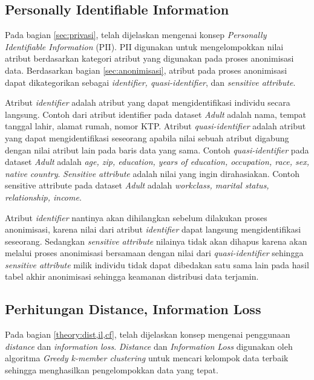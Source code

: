 \subsection{Personally Identifiable Information}
Pada bagian \ref{sec:privasi}, telah dijelaskan mengenai konsep \textit{Personally Identifiable Information} (PII). PII digunakan untuk mengelompokkan nilai atribut berdasarkan kategori atribut yang digunakan pada proses anonimisasi data. Berdasarkan bagian \ref{sec:anonimisasi}, atribut pada proses anonimisasi dapat dikategorikan sebagai \textit{identifier, quasi-identifier}, dan \textit{sensitive attribute}. 
\par Atribut \textit{identifier} adalah atribut yang dapat mengidentifikasi individu secara langsung. Contoh dari atribut identifier pada dataset \textit{Adult} adalah nama, tempat tanggal lahir, alamat rumah, nomor KTP. Atribut \textit{quasi-identifier} adalah atribut yang dapat mengidentifikasi seseorang apabila nilai sebuah atribut digabung dengan nilai atribut lain pada baris data yang sama. Contoh \textit{quasi-identifier} pada dataset \textit{Adult} adalah \textit{age, zip, education, years of education, occupation, race, sex, native country}. \textit{Sensitive attribute} adalah nilai yang ingin dirahasiakan. Contoh sensitive attribute pada dataset \textit{Adult} adalah \textit{workclass, marital status, relationship, income}.
\par Atribut \textit{identifier} nantinya akan dihilangkan sebelum dilakukan proses anonimisasi, karena nilai dari atribut \textit{identifier} dapat langsung mengidentifikasi seseorang. Sedangkan \textit{sensitive attribute} nilainya tidak akan dihapus karena akan melalui proses anonimisasi bersamaan dengan nilai dari \textit{quasi-identifier} sehingga \textit{sensitive attribute} milik individu tidak dapat dibedakan satu sama lain pada hasil tabel akhir anonimisasi sehingga keamanan  distribusi data terjamin.


\subsection{Perhitungan Distance, Information Loss}
Pada bagian \ref{theory:dist,il,cf}, telah dijelaskan konsep mengenai penggunaan \textit{distance} dan \textit{information loss}. \textit{Distance} dan \textit{Information Loss} digunakan oleh algoritma \textit{Greedy k-member clustering} untuk mencari kelompok data terbaik sehingga menghasilkan pengelompokkan data yang tepat. 

